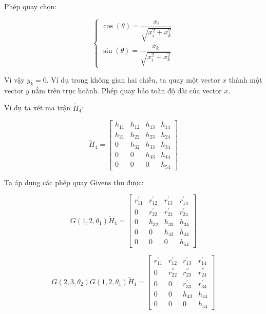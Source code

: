 \documentclass[14pt, a4paper]{article}
\numberwithin{equation}{section}
\numberwithin{algorithm}{section}
\numberwithin{figure}{section}
\numberwithin{dl}{section}
\numberwithin{md}{section}
\numberwithin{bd}{section}
\numberwithin{dn}{section}
\numberwithin{hq}{section}
\begin{document}
Phép quay chọn:

\begin{equation}
    \begin{cases}
        \cos(\theta) = \dfrac{x_i}{\sqrt{x_i^2 + x_k^2}} \\
        \sin(\theta) = \dfrac{x_k}{\sqrt{x_i^2 + x_k^2}}
    \end{cases}
\end{equation}

Vì vậy $y_k = 0$. Ví dụ trong không gian hai chiều, ta quay một vector $x$ thành một vector $y$ nằm trên trục hoành. Phép quay bảo toàn độ dài của vector $x$.

Ví dụ ta xét ma trận $\widetilde{H}_4$:

\begin{equation}
    \widetilde{H}_4 = \begin{bmatrix} h_{11} & h_{12} & h_{13} & h_{14} \\
                                    h_{21} & h_{22} & h_{23} & h_{24} \\
                                    0 & h_{32} & h_{33} & h_{34} \\
                                    0 & 0 & h_{43} & h_{44} \\
                                    0 & 0 & 0 & h_{54}  \end{bmatrix}
\end{equation}

Ta áp dụng các phép quay Givens thu được:

\begin{equation}
    G(1, 2, \theta_1) \widetilde{H}_4 = \begin{bmatrix} r_{11}^{'} & r_{12}^{'} & r_{13}^{'} & r_{14}^{'} \\
        0 & r_{22}^{'} & r_{23}^{'} & r_{24}^{'} \\
        0 & h_{32} & h_{33} & h_{34} \\
        0 & 0 & h_{43} & h_{44} \\
        0 & 0 & 0 & h_{54}  \end{bmatrix}
\end{equation}

\begin{equation}
    G(2, 3, \theta_2)G(1, 2, \theta_1) \widetilde{H}_4 = \begin{bmatrix} r_{11}^{'} & r_{12}^{'} & r_{13}^{'} & r_{14}^{'} \\
        0 & r_{22}^{''} & r_{23}^{''} & r_{24}^{''} \\
        0 & 0 & r_{33}^{'} & r_{34}^{'} \\
        0 & 0 & h_{43} & h_{44} \\
        0 & 0 & 0 & h_{54}  \end{bmatrix}
\end{equation}
\end{document}
